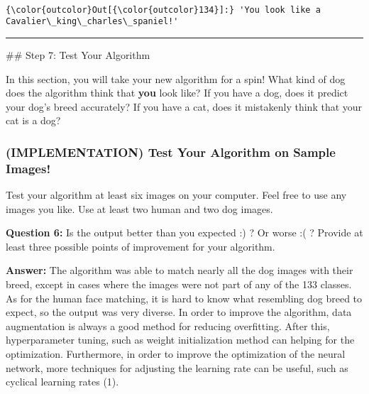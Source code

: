 \documentclass[11pt]{article}
\begin{document}
    \begin{center}
    \end{center}
    { \hspace*{\fill} \\}
    
\begin{Verbatim}[commandchars=\\\{\}]
{\color{outcolor}Out[{\color{outcolor}134}]:} 'You look like a Cavalier\_king\_charles\_spaniel!'
\end{Verbatim}
            
    \begin{center}\rule{0.5\linewidth}{\linethickness}\end{center}

 \#\# Step 7: Test Your Algorithm

In this section, you will take your new algorithm for a spin! What kind
of dog does the algorithm think that \textbf{you} look like? If you have
a dog, does it predict your dog's breed accurately? If you have a cat,
does it mistakenly think that your cat is a dog?

\subsubsection{(IMPLEMENTATION) Test Your Algorithm on Sample
Images!}\label{implementation-test-your-algorithm-on-sample-images}

Test your algorithm at least six images on your computer. Feel free to
use any images you like. Use at least two human and two dog images.

\textbf{Question 6:} Is the output better than you expected :) ? Or
worse :( ? Provide at least three possible points of improvement for
your algorithm.

\textbf{Answer:} The algorithm was able to match nearly all the dog
images with their breed, except in cases where the images were not part
of any of the 133 classes. As for the human face matching, it is hard to
know what resembling dog breed to expect, so the output was very
diverse. In order to improve the algorithm, data augmentation is always
a good method for reducing overfitting. After this, hyperparameter
tuning, such as weight initialization method can helping for the
optimization. Furthermore, in order to improve the optimization of the
neural network, more techniques for adjusting the learning rate can be
useful, such as cyclical learning rates (1).
\end{document}
